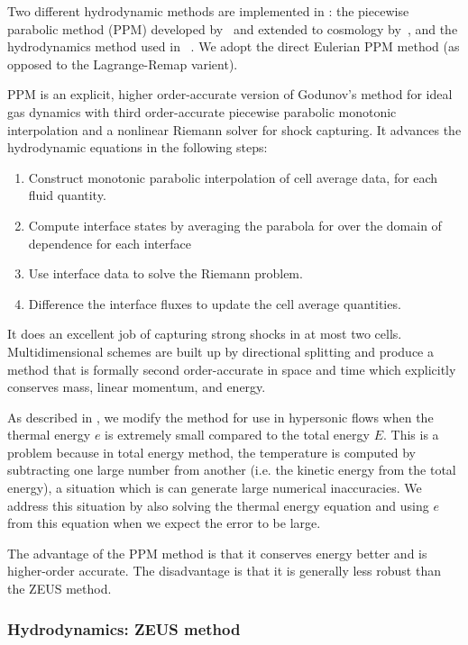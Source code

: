 Two different hydrodynamic methods are implemented in \enzo: the
piecewise parabolic method (PPM) developed by~\citet{1984JCoPh..54..174C}
and extended to cosmology by~\citet{1995CoPhC..89..149B},
and the hydrodynamics method used in \zeus~\citep{Stone92a,Stone92b}.
We adopt the direct Eulerian PPM method (as opposed to the Lagrange-Remap varient).

PPM is an explicit, higher order-accurate version of
Godunov's method for ideal gas dynamics with third order-accurate piecewise parabolic
monotonic interpolation and a nonlinear Riemann solver for shock
capturing.  It advances the hydrodynamic equations in the following
steps:
\begin{enumerate}
 \item Construct monotonic parabolic interpolation of cell average
 data, for each fluid quantity.
 \item Compute interface states by averaging the parabola for over the domain of dependence for
 each interface
 \item Use interface data to solve the Riemann problem.
 \item Difference the interface fluxes to update the cell average quantities.
\end{enumerate}
It does an excellent job of capturing strong shocks in at
most two cells.  Multidimensional schemes are built up by directional
splitting and produce a method that is formally second order-accurate
in space and time which explicitly conserves mass, linear momentum, and energy.

As described in \citet{Bryan95}, we modify the method for use in hypersonic flows when the thermal energy $e$ is extremely small compared to the total energy $E$.  This is a problem because in total energy method, the temperature is computed by subtracting one large number from another (i.e. the kinetic energy from the total energy), a situation which is can generate large numerical inaccuracies.  We address this situation by also solving the thermal energy equation and using $e$ from this equation when we expect the error to be large.

The advantage of the PPM method is that it conserves energy better and is higher-order accurate.  The disadvantage is that it is generally less robust than the ZEUS method.



\subsubsection{Hydrodynamics: ZEUS method}

